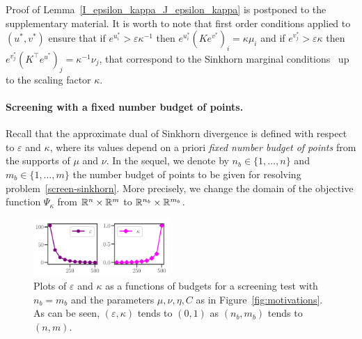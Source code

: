 Proof of Lemma~\ref{I_epsilon_kappa_J_epsilon_kappa} is postponed to the supplementary material. It is worth to note that first order conditions applied to $(u^{*}, v^{*})$ ensure that if $e^{u^{*}_i} > \varepsilon\kappa^{-1}$ then $e^{u^{*}_i} (Ke^{v^{*}})_i =  \kappa\mu_i$ and if $e^{v^{*}_j} > \varepsilon\kappa$ then $e^{v^{*}_j} (K^\top e^{u^{*}})_j =  \kappa^{-1}\nu_j$, that correspond to the Sinkhorn marginal conditions~\citep{peyre2019COTnowpublisher} up to the scaling factor $\kappa$. 

\paragraph{Screening with a fixed number budget of points.}

Recall that the approximate dual of Sinkhorn divergence is defined with respect to $\varepsilon$ and $\kappa$, where its values depend on a priori \emph{fixed number budget of points} from the supports of $\mu$ and $\nu$.
In the sequel, we denote by $n_b \in\{1, \ldots, n\}$ and $m_b\in\{1, \ldots, m\}$ the number budget of points to be given for resolving problem~\eqref{screen-sinkhorn}. More precisely, we change the domain of the objective function $\Psi_\kappa$ from ${\mathbb{R}}^n \times {\mathbb{R}}^m$ to ${\mathbb{R}}^{n_b} \times {\mathbb{R}}^{m_b}$.

\begin{figure}
\vspace{-18pt}
\centering
\includegraphics[width=0.46\textwidth]{./figs/kappa_epsilon.pdf}
\caption{Plots of $\varepsilon$ and $\kappa$ as a functions of budgets for a screening test with $n_b=m_b$ and the parameters $\mu, \nu, \eta, C$ as in Figure~\eqref{fig:motivations}. As can be seen, $(\varepsilon, \kappa)$ tends to $(0,1)$ as $(n_b,m_b)$ tends to $(n,m)$.}
\label{fig:kappa_epsilon}
\vspace{-15pt}
\end{figure}

